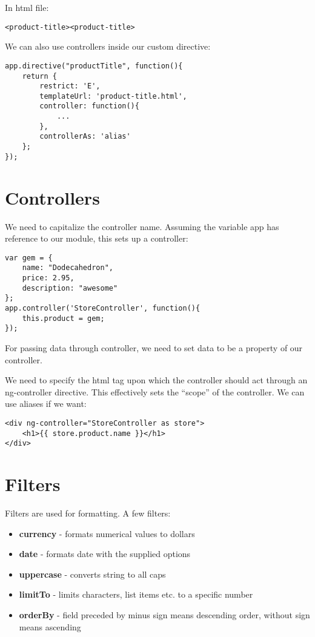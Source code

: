 \documentclass[a4paper, 12pt]{article}
\begin{document}
In html file:
\begin{verbatim}
<product-title><product-title>
\end{verbatim}

We can also use controllers inside our custom directive:
\begin{verbatim}
app.directive("productTitle", function(){
	return {
		restrict: 'E',
		templateUrl: 'product-title.html',
		controller: function(){
			...
		},
		controllerAs: 'alias'
	};
});
\end{verbatim}

\section{Controllers}
We need to capitalize the controller name. Assuming the variable app has reference to our module, this sets up a controller:
\begin{verbatim}
var gem = {
	name: "Dodecahedron",
	price: 2.95,
	description: "awesome"
};
app.controller('StoreController', function(){
	this.product = gem;
});
\end{verbatim}
For passing data through controller, we need to set data to be a property of our controller.

We need to specify the html tag upon which the controller should act through an ng-controller directive.
This effectively sets the ``scope'' of the controller. We can use aliases if we want:
\begin{verbatim}
<div ng-controller="StoreController as store">
	<h1>{{ store.product.name }}</h1>
</div>
\end{verbatim}

\section{Filters}
Filters are used for formatting. A few filters:
\begin{itemize}
	\item \textbf{currency} - formats numerical values to dollars
	\item \textbf{date} - formats date with the supplied options
	\item \textbf{uppercase} - converts string to all caps
	\item \textbf{limitTo} - limits characters, list items etc. to a specific number
	\item \textbf{orderBy} - field preceded by minus sign means descending order, without sign means ascending 
\end{itemize}
\end{document}
